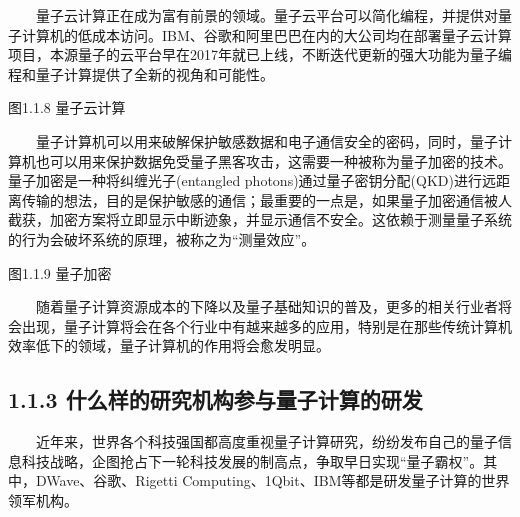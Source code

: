 \documentclass[a4paper,11pt,english]{sphinxmanual}
\begin{document}
\sphinxAtStartPar
{}

\sphinxAtStartPar
  量子云计算正在成为富有前景的领域。量子云平台可以简化编程，并提供对量子计算机的低成本访问。IBM、谷歌和阿里巴巴在内的大公司均在部署量子云计算项目，本源量子的云平台早在2017年就已上线，不断迭代更新的强大功能为量子编程和量子计算提供了全新的视角和可能性。


\begin{center}图1.1.8 量子云计算
\end{center}
\sphinxAtStartPar
{}

\sphinxAtStartPar
  量子计算机可以用来破解保护敏感数据和电子通信安全的密码，同时，量子计算机也可以用来保护数据免受量子黑客攻击，这需要一种被称为量子加密的技术。量子加密是一种将纠缠光子(entangled photons)通过量子密钥分配(QKD)进行远距离传输的想法，目的是保护敏感的通信；最重要的一点是，如果量子加密通信被人截获，加密方案将立即显示中断迹象，并显示通信不安全。这依赖于测量量子系统的行为会破坏系统的原理，被称之为“测量效应”。


\begin{center}图1.1.9 量子加密
\end{center}
\sphinxAtStartPar
  随着量子计算资源成本的下降以及量子基础知识的普及，更多的相关行业者将会出现，量子计算将会在各个行业中有越来越多的应用，特别是在那些传统计算机效率低下的领域，量子计算机的作用将会愈发明显。


\subsection{1.1.3 什么样的研究机构参与量子计算的研发}
\label{\detokenize{rst/1.1_u4e09_u95ee_u91cf_u5b50_u8ba1_u7b97:id4}}
\sphinxAtStartPar
  近年来，世界各个科技强国都高度重视量子计算研究，纷纷发布自己的量子信息科技战略，企图抢占下一轮科技发展的制高点，争取早日实现“量子霸权”。其中，D\sphinxhyphen{}Wave、谷歌、Rigetti Computing、1Qbit、IBM等都是研发量子计算的世界领军机构。

\end{document}
